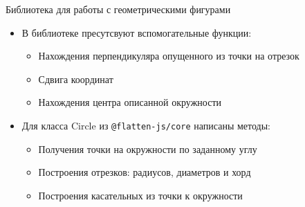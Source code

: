 \documentclass[aspectratio=169,12pt]{beamer}
\begin{document}
\begin{frame}{Библиотека для работы с геометрическими фигурами}
	\begin{itemize}
		\item В библиотеке пресутсвуют вспомогательные функции:
		\begin{itemize}
			\item Нахождения перпендикуляра опущенного из точки на отрезок
			\item Сдвига координат
			\item Нахождения центра описанной окружности
		\end{itemize}
		\item Для класса Circle из \texttt{@flatten-js/core} написаны методы:
		      \begin{itemize}
			      \item Получения точки на окружности по заданному углу
			      \item Построения отрезков: радиусов, диаметров и хорд
			      \item Построения касательных из точки к окружности
		      \end{itemize}
	\end{itemize}
\end{frame}
\end{document}
